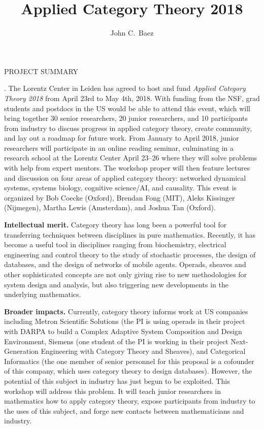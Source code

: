 \documentclass[12pt,letterpaper]{amsart}
\newcommand{\ctr}[1]{\begin{center} #1 \end{center}}
\begin{document}
\ctr{\large PROJECT SUMMARY}
\title{Applied Category Theory 2018}
\author{John C.\ Baez}

\maketitle

.  The Lorentz Center in Leiden has agreed to host and fund
\textsl{Applied Category Theory 2018} from April 23rd to May 4th, 2018.  With funding from the NSF, grad students and postdocs in the US would be able to attend this event, which will bring together 30 senior researchers, 20 junior researchers, and 10 participants from industry to discuss progress in applied category theory, create community, and lay out a roadmap for future work.  From January to April 2018, junior researchers will participate in an online reading seminar, culminating in a research school at the Lorentz Center April 23--26 where they will solve problems with help from expert mentors.  The workshop proper will then feature lectures and discussion on four areas of applied category theory: networked dynamical systems, systems biology, cognitive science/AI, and causality.  This event is organized by Bob Coecke (Oxford), Brendan Fong (MIT), Aleks Kissinger (Nijmegen), Martha Lewis (Amsterdam), and Joshua Tan (Oxford).

\noindent \textbf{Intellectual merit.}  Category theory has long been a powerful tool for transferring techniques between disciplines in pure mathematics.  Recently, it has become a useful tool in disciplines ranging from biochemistry, electrical engineering and control theory to the study of stochastic processes, the design of databases, and the design of networks of mobile agents.   Operads, sheaves and other sophisticated concepts are not only giving rise to new methodologies for system design and analysis, but also triggering new developments in the underlying mathematics.

\noindent \textbf{Broader impacts.} 
Currently, category theory informs work at US companies including Metron Scientific Solutions (the PI is using operads in their project with DARPA to build a Complex Adaptive System Composition and Design Environment, Siemens (one student of the PI is working in their project Next-Generation Engineering with Category Theory and Sheaves), and Categorical Informatics (the one member of senior personnel for this proposal is a cofounder of this company, which uses category theory to design databases).   However, the potential of this subject in industry has just begun to be exploited.  This workshop will address this problem.  It will teach junior researchers in mathematics how to apply category theory, expose participants from industry to the uses of this subject, and forge new contacts between mathematicians and industry.  
\end{document}
